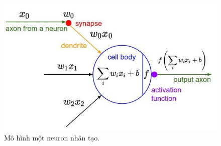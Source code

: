 \begin{figure}[ht!]
	\centerline{\includegraphics[scale=0.6]{images/aneuron.jpg}}
  	\caption{Mô hình một neuron nhân tạo.}
  	\label{fig:aneuron}
\end{figure}


